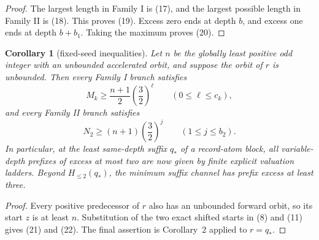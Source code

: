 \documentclass[11pt]{article}
\newtheorem{corollary}[theorem]{Corollary}
\begin{document}
\begin{proof}
The largest length in Family I is (17), and the largest possible length
in Family II is (18).  This proves (19).  Excess zero ends at depth $b$,
and excess one ends at depth $b+b_1$.  Taking the maximum proves (20).
\end{proof}

\begin{corollary}[fixed-seed inequalities]
Let $n$ be the globally least positive odd integer with an unbounded
accelerated orbit, and suppose the orbit of $r$ is unbounded.  Then every
Family I branch satisfies
\[
 \boxed{
 M_k\geq\frac{n+1}{2}\left(\frac32\right)^\ell
 \qquad(0\leq\ell\leq c_k),}
 \tag{21}
\]
and every Family II branch satisfies
\[
 \boxed{
 N_2\geq(n+1)\left(\frac32\right)^j
 \qquad(1\leq j\leq b_2).}
 \tag{22}
\]
In particular, at the least same-depth suffix $q_*$ of a record-atom
block, all variable-depth prefixes of excess at most two are now given
by finite explicit valuation ladders.  Beyond $H_{\leq2}(q_*)$, the
minimum suffix channel has prefix excess at least three.
\end{corollary}

\begin{proof}
Every positive predecessor of $r$ also has an unbounded forward orbit,
so its start $z$ is at least $n$.  Substitution of the two exact shifted
starts in (8) and (11) gives (21) and (22).  The final assertion is
Corollary~2 applied to $r=q_*$.
\end{proof}
\end{document}
